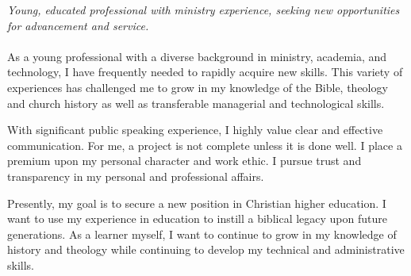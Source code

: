 
\vspace{-1.3em} %

\begin{multicols}{2}  %
\noindent \textit{Young, educated professional with ministry experience, seeking new opportunities for advancement and service.}\\\\

As a young professional with a diverse background in ministry, academia, and technology, I have frequently needed to rapidly acquire new skills. This variety of experiences has challenged me to grow in my knowledge of the Bible, theology and church history as well as transferable managerial and technological skills.

With significant public speaking experience, I highly value clear and effective communication. For me, a project is not complete unless it is done well. I place a premium upon my personal character and work ethic. I pursue trust and transparency in my personal and professional affairs.

Presently, my goal is to secure a new position in Christian higher education. I want to use my experience in education to instill a biblical legacy upon future generations. As a learner myself, I want to continue to grow in my knowledge of history and theology while continuing to develop my technical and administrative skills.

\end{multicols}

